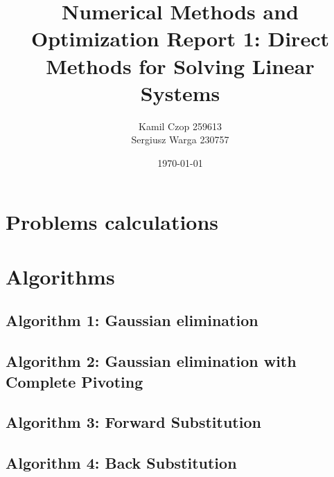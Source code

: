 \documentclass[a4paper]{article}
\title{Numerical Methods and Optimization Report 1: Direct Methods for Solving Linear Systems}
\author{Kamil Czop 259613\\Sergiusz Warga 230757}
\date{\today}
\begin{document}
\maketitle
\tableofcontents
\pagebreak


\section{Problems calculations}






% 

\section{Algorithms}
\subsection{Algorithm 1: Gaussian elimination}\label{algorithm:1}

\subsection{Algorithm 2: Gaussian  elimination  with  Complete  Pivoting}\label{algorithm:2}

\subsection{Algorithm 3: Forward Substitution}\label{algorithm:3}

\subsection{Algorithm 4: Back Substitution}\label{algorithm:4}

\end{document}
